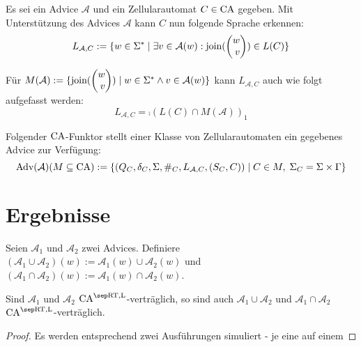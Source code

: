 \begin{definition}
    Es sei ein Advice $\mathcal{A}$ und ein Zellularautomat $C \in \textrm{CA}$ gegeben. Mit Unterstützung des Advices $\mathcal{A}$ kann $C$ nun folgende Sprache erkennen:
    \[
         L_{\mathcal{A}, C} := \set{ w \in \Sigma^*}{\exists v \in \mathcal{A}(w): \comb(\Spvek{w; v}) \in L(C)}
    \]
    
    Für $M(\mathcal{A}) := \set{ \comb(\Spvek{ w; v}) }
        { w \in \Sigma^* \land v \in \mathcal{A}(w) }$
    kann $L_{\mathcal{A}, C}$ auch wie folgt aufgefasst werden:
    \[
        L_{\mathcal{A}, C} = \comp(
            L(C) \cap M(\mathcal{A})
        )_1
    \]
    
    Folgender $\textrm{CA}$-Funktor stellt einer Klasse von Zellularautomaten ein gegebenes Advice zur Verfügung:
    \[
        \textrm{Adv}(\mathcal{A})(M \subseteq \textrm{CA}) := \{ { (Q_C, \delta_C, \Sigma, \#_C, L_{\mathcal{A}, C}, (S_C, C))} \; | \; { C \in M, \; \Sigma_C = \Sigma \times \Gamma } \}
    \]
\end{definition}

\section{Ergebnisse}

\begin{satz}
    Seien $\mathcal{A}_1$ und $\mathcal{A}_2$ zwei Advices.
    Definiere $(\mathcal{A}_1 \cup \mathcal{A}_2)(w) := \mathcal{A}_1(w) \cup \mathcal{A}_2(w)$ und 
    $(\mathcal{A}_1 \cap \mathcal{A}_2)(w) := \mathcal{A}_1(w) \cap \mathcal{A}_2(w)$.
    
    Sind $\mathcal{A}_1$ und $\mathcal{A}_2$ $\CAM{\CART, \CALeft}$-verträglich, so sind
    auch $\mathcal{A}_1 \cup \mathcal{A}_2$ und $\mathcal{A}_1 \cap \mathcal{A}_2$
    $\CAM{\CART, \CALeft}$-verträglich.
\end{satz}
\begin{proof}
    Es werden entsprechend zwei Ausführungen simuliert - je eine auf einem 
    
\end{proof}

